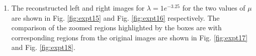 \begin{enumerate}
\item The reconstructed left and right images for $\lambda = 1e^{-3.25}$ for the two values of $\mu$ are shown in Fig. \ref{fig:expt15} and  Fig. \ref{fig:expt16} respectively. The comparison of the zoomed regions highlighted by the boxes are with corresponding regions from the original images are shown in Fig. \ref{fig:expt17}  and Fig. \ref{fig:expt18}.


\vspace{-0.2in}
\begin{figure}[H]
\hspace{-0.5in}
\hspace{-1in}
\end{figure}
\end{enumerate}
